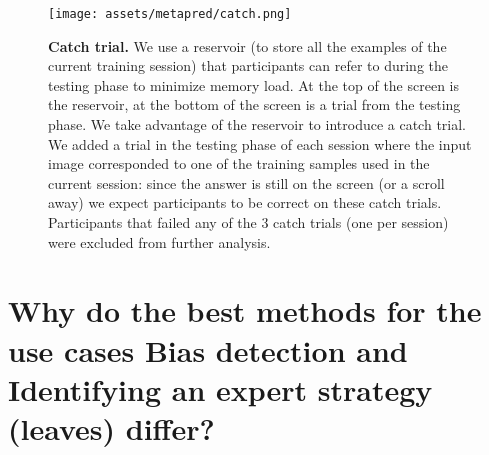\begin{figure*}
    \centering
    \texttt{[image: assets/metapred/catch.png]}
    \caption{\textbf{Catch trial.} We use a reservoir (to store all the examples of the current training session) that participants can refer to during the testing phase to minimize memory load. At the top of the screen is the reservoir, at the bottom of the screen is a trial from the testing phase. We take advantage of the reservoir to introduce a catch trial. We added a trial in the testing phase of each session where the input image corresponded to one of the training samples used in the current session: since the answer is still on the screen (or a scroll away) we expect participants to be correct on these catch trials. Participants that failed any of the 3 catch trials (one per session) were excluded from further analysis.}
    \label{fig:catch}
\end{figure*}
\clearpage

\section{Why do the best methods for the use cases Bias detection and Identifying an expert strategy (leaves) differ?}
\label{ap:differ}

